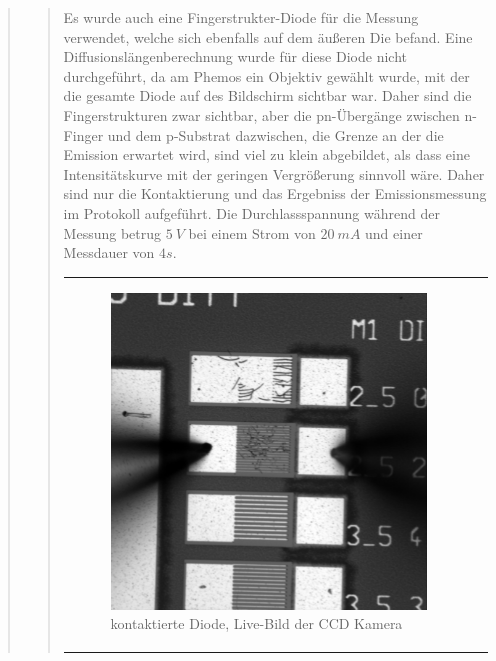 \begin{quote}
\begin{quote}
        Es wurde auch eine Fingerstrukter-Diode für die Messung verwendet,
        welche sich ebenfalls auf dem äußeren Die befand. Eine
        Diffusionslängenberechnung wurde für diese Diode nicht durchgeführt, da
        am Phemos ein Objektiv gewählt wurde, mit der die gesamte Diode auf des
        Bildschirm sichtbar war. Daher sind die Fingerstrukturen zwar sichtbar,
        aber die pn-Übergänge zwischen n-Finger und dem p-Substrat dazwischen,
        die Grenze an der die Emission erwartet wird, sind viel zu klein
        abgebildet, als dass eine Intensitätskurve mit der geringen Vergrößerung
        sinnvoll wäre. Daher sind nur die Kontaktierung und das Ergebniss der
        Emissionsmessung im Protokoll aufgeführt. Die Durchlassspannung während
        der Messung betrug $5\ V$ bei einem Strom von $20\ mA$ und einer
        Messdauer von $4s$.


            \begin{center}
                \begin{tabular}{ll}

                \hspace{-10em}
                    \begin{minipage}{0.6\textwidth}

                        \begin{figure}[H]
                            \label{fig:nbmkhjuk}
                            \includegraphics[scale=0.25, trim = 0cm 0cm 0cm
                            0cm,
                            clip]{./Emissionsbilder/fuenf/nach_Kontaktierung.png}
                            \caption{kontaktierte Diode, Live-Bild der CCD
                            Kamera}
                        \end{figure}


\end{minipage}
\end{tabular}
\end{center}
\end{quote}
\end{quote}
